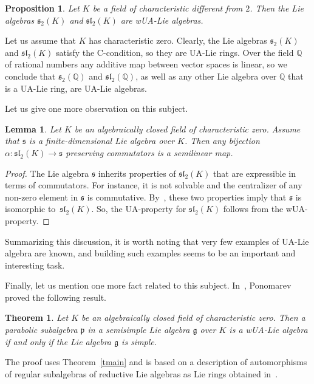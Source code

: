 \documentclass[a4paper,draft,reqno,12pt]{amsart}
\newtheorem{proposition}{Proposition}
\newtheorem{lemma}{Lemma}
\newtheorem{theorem}{Theorem}
\theoremstyle{definition}
\theoremstyle{remark}
\def\QQ{{\mathbb Q}}
\def\ggg{\mathfrak{g}}
\def\sss{\mathfrak{s}}
\def\ppp{\mathfrak{p}}
\def\sl{\mathfrak{sl}}
\begin{document}
\begin{proposition}
Let $K$ be a field of characteristic different from $2$. Then the Lie algebras $\sss_2(K)$ and $\sl_2(K)$ are wUA-Lie algebras.  
\end{proposition} 

Let us assume that $K$ has characteristic zero. Clearly, the Lie algebras $\sss_2(K)$ and $\sl_2(K)$ satisfy the C-condition, so they are UA-Lie rings. Over the field $\QQ$ of rational numbers any additive map between vector spaces is linear, so we conclude that $\sss_2(\QQ)$ and $\sl_2(\QQ)$, as well as any other Lie algebra over $\QQ$ that is a UA-Lie ring, are UA-Lie algebras. 

\smallskip

Let us give one more observation on this subject.

\begin{lemma}
Let $K$ be an algebraically closed field of characteristic zero. Assume that $\sss$ is a finite-dimensional Lie algebra over $K$. Then any bijection $\alpha\colon\sl_2(K)\to\sss$ preserving commutators is a semilinear map. 
\end{lemma}

\begin{proof}
The Lie algebra $\sss$ inherits properties of $\sl_2(K)$ that are expressible in terms of commutators. For instance, it is not solvable and the centralizer of any non-zero element in $\sss$ is commutative. By~\cite[Proposition~2]{AMP}, these two properties imply that $\sss$ is isomorphic to~$\sl_2(K)$. So, the UA-property for $\sl_2(K)$ follows from the wUA-property.    
\end{proof} 

Summarizing this discussion, it is worth noting that very few examples of UA-Lie algebra are known, and building such examples seems to be an important and interesting task.

\smallskip

Finally, let us mention one more fact related to this subject. In~\cite{Pon2}, Ponomarev proved the following result.
 
\begin{theorem}
Let $K$ be an algebraically closed field of characteristic zero. Then a parabolic subalgebra $\ppp$ in a semisimple Lie algebra $\ggg$ over $K$ is a wUA-Lie algebra if and only if the Lie algebra 
$\ggg$ is simple.
\end{theorem} 

The proof uses Theorem~\ref{tmain} and is based on a description of automorphisms of regular subalgebras of reductive Lie algebras as Lie rings obtained in~\cite{Pon1}. 
\end{document}
